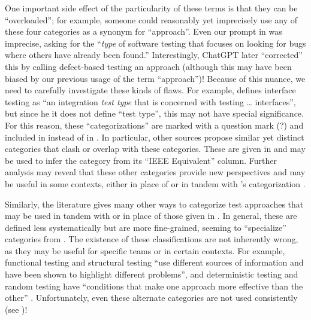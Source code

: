 One important side effect of the particularity of these terms is that they can
be ``overloaded''; for example, someone could reasonably yet imprecisely use
any of these four categories as a synonym for ``approach''. Even our prompt in
\ifnotpaper \citep[emphasis added]{ChatGPT2024} \else \cite{ChatGPT2024} \fi was
imprecise, asking for the ``\emph{type} of software testing that focuses on
looking for bugs where others have already been found.'' Interestingly, ChatGPT
later ``corrected'' this by calling defect-based testing an approach (although
this may have been biased by our previous usage of the term ``approach'')!
Because of this nuance, we need to carefully investigate these kinds of
flaws. For example, \citet[p.~45\ifnotpaper, emphasis added\fi]{Kam2008}
defines interface testing as ``an integration \emph{test type} that is
concerned with testing \dots{} interfaces'', but since \ifnotpaper he \else it
\fi does not define ``test type'', this may not have special significance.
\ifnotpaper For this reason, these ``categorizations'' are marked with a
    question mark (?) and included in  instead of in
    . In particular, other sources
    \citep[such as][]{SWEBOK2024,BarbosaEtAl2006} propose similar yet distinct
    categories that clash or overlap with these categories. These are given in
     and may be used to infer the category from its ``IEEE
    Equivalent'' column. Further analysis may reveal that these other
    categories provide new perspectives and may be useful in some contexts,
    either in place of or in tandem with \citeauthor{IEEE2022}'s categorization
    \citeyearpar{IEEE2022}.
    \newpage

    \begin{landscape}
        \otherCatsTable{}
    \end{landscape}

    Similarly, the literature gives many other ways to categorize test
    approaches that may be used in tandem with or in place of those given in
    . In general, these are defined less
    systematically but are more fine-grained, seeming to ``specialize''
    categories from . The existence of these classifications
    are not inherently wrong, as they may be useful for specific teams or in
    certain contexts. For example, functional testing and structural testing
    ``use different sources of information and have been shown to highlight
    different problems'', and deterministic testing and random testing have
    ``conditions that make one approach more effective than the other''
    \citep[p.~5\=/16]{SWEBOK2024}. Unfortunately, even these alternate
    categories are not used consistently (see )!

